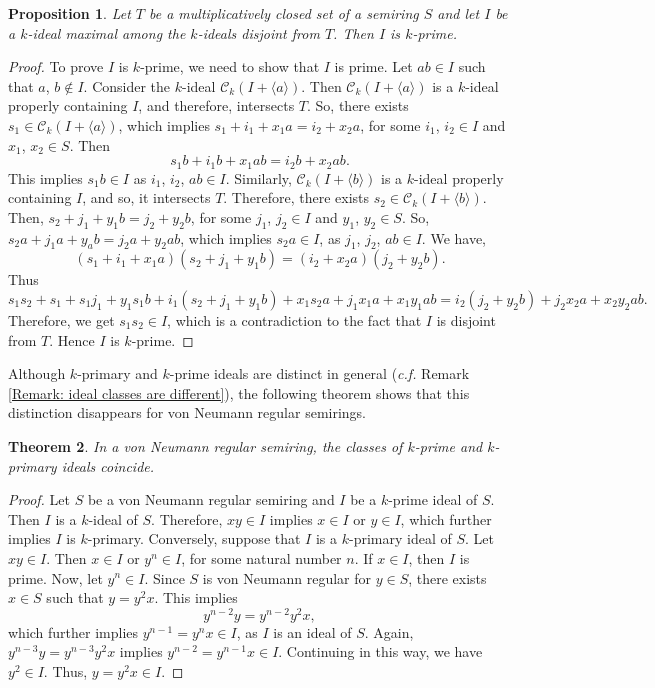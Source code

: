 \documentclass[11pt,leqno]{amsart}
\newtheorem{theorem}{Theorem}[section]
\newtheorem{proposition}[theorem]{Proposition}
\theoremstyle{definition}
\numberwithin{equation}{section}
\begin{document}
\begin{proposition}\label{krull's theorem}
    Let $T$ be a multiplicatively closed set of a semiring $S$ and let $I$ be a $k$-ideal maximal among the $k$-ideals disjoint from $T$. Then $I$ is $k$-prime.
\end{proposition}

\begin{proof}
 To prove $I$ is $k$-prime, we need to show that $I$ is prime. Let $ab \in I$ such that $a$, $b \notin I$. Consider the $k$-ideal $\mathcal{C}_k(I+\langle a\rangle)$. Then $\mathcal{C}_k(I+\langle a\rangle)$ is a $k$-ideal properly containing $I$, and therefore, intersects $T$. So, there exists $s_1 \in \mathcal{C}_k(I+\langle a\rangle)$, which implies $s_1+i_1+x_1a=i_2+x_2a$, for some $i_1$, $i_2 \in I$ and $x_1$, $x_2 \in S$. Then $$s_1b+i_1b+x_1ab=i_2b+x_2ab.$$ This implies $s_1b \in I$ as $i_1$, $i_2$, $ab \in I$. Similarly, $\mathcal{C}_k(I+\langle b\rangle)$ is a $k$-ideal properly containing $I$, and so, it intersects $T$. Therefore, there exists $s_2 \in \mathcal{C}_k(I+\langle b\rangle)$. Then, $s_2+j_1+y_1b=j_2+y_2b$, for some $j_1$, $j_2 \in I$ and $y_1$, $y_2 \in S$. So, $s_2a+j_1a+y_ab=j_2a+y_2ab$, which implies $s_2a \in I$, as $j_1$, $j_2$, $ab \in I$. We have, \[(s_1+i_1+x_1a)(s_2+j_1+y_1b)=(i_2+x_2a)(j_2+y_2b).\] Thus \[s_1s_2+s_1+s_1j_1+y_1s_1b+i_1(s_2+j_1+y_1b)+x_1s_2a+j_1x_1a+x_1y_1ab=i_2(j_2+y_2b)+j_2x_2a+x_2y_2ab.\] Therefore, we get $s_1s_2 \in I$, which is a contradiction to the fact that $I$ is disjoint from $T$. Hence $I$ is $k$-prime.
\end{proof}
Although $k$-primary and $k$-prime ideals are distinct in general (\textit{c.f.} Remark \ref{Remark: ideal classes are different}), the following theorem shows that this distinction disappears for von Neumann regular semirings. 

\begin{theorem}\label{loc14}
    In a von Neumann regular semiring, the classes of $k$-prime and $k$-primary ideals coincide.
\end{theorem}

\begin{proof}
    Let $S$ be a von Neumann regular semiring and $I$ be a $k$-prime ideal of $S$. Then $I$ is a $k$-ideal of $S$. Therefore, $xy \in I$ implies $x \in I$ or $y \in I$, which further implies $I$ is $k$-primary.
    Conversely, suppose that $I$ is a $k$-primary ideal of $S$. Let $xy \in I$. Then $x \in I$ or $y^n \in I $, for some natural number $n$. If $x \in I$, then $I$ is prime. Now, let $y^n \in I$. Since $S$ is von Neumann regular for $y \in S$, there exists $x \in S$ such that $y=y^2x$. This implies $$y^{n-2} y = y^{n-2}y^2x,$$ which further implies $y^{n-1}=y^nx \in I$, as $I$ is an ideal of $S$. Again, $y^{n-3} y=y^{n-3} y^2x$ implies $y^{n-2}=y^{n-1}x \in I$. Continuing in this way, we have $y^2 \in I$. Thus, $y=y^2x \in I$.
\end{proof}
\end{document}
